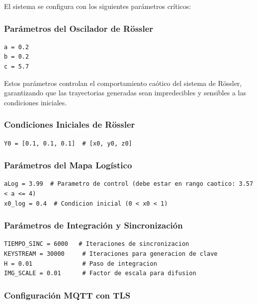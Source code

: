 \documentclass[12pt,a4paper]{article}
\begin{document}
El sistema se configura con los siguientes parámetros críticos:

\subsubsection{Parámetros del Oscilador de Rössler}

\begin{lstlisting}
a = 0.2
b = 0.2
c = 5.7
\end{lstlisting}

Estos parámetros controlan el comportamiento caótico del sistema de Rössler, garantizando que las trayectorias generadas sean impredecibles y sensibles a las condiciones iniciales.

\subsubsection{Condiciones Iniciales de Rössler}

\begin{lstlisting}
Y0 = [0.1, 0.1, 0.1]  # [x0, y0, z0]
\end{lstlisting}

\subsubsection{Parámetros del Mapa Logístico}

\begin{lstlisting}
aLog = 3.99  # Parametro de control (debe estar en rango caotico: 3.57 < a <= 4)
x0_log = 0.4  # Condicion inicial (0 < x0 < 1)
\end{lstlisting}

\subsubsection{Parámetros de Integración y Sincronización}

\begin{lstlisting}
TIEMPO_SINC = 6000   # Iteraciones de sincronizacion
KEYSTREAM = 30000     # Iteraciones para generacion de clave
H = 0.01              # Paso de integracion
IMG_SCALE = 0.01      # Factor de escala para difusion
\end{lstlisting}

\subsubsection{Configuración MQTT con TLS}
\end{document}

